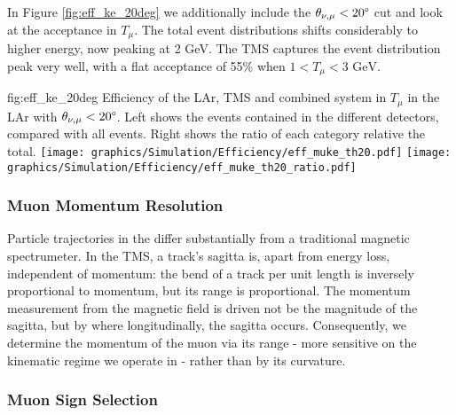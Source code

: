 In Figure \ref{fig:eff_ke_20deg} we additionally include the $\theta_{\nu,\mu}<20\degree$ cut and look at the acceptance in $T_\mu$. The total event distributions shifts considerably to higher energy, now peaking at 2 GeV. The TMS captures the event distribution peak very well, with a flat acceptance of 55\% when $1 < T_\mu < 3 \text{ GeV}$.
\begin{dunefigure}[]{fig:eff_ke_20deg}
{Efficiency of the LAr, TMS and combined system in $T_\mu$ in the LAr with $\theta_{\nu,\mu}<20\degree$. Left shows the events contained in the different detectors, compared with all events. Right shows the ratio of each category relative the total.}
\texttt{[image: graphics/Simulation/Efficiency/eff\_muke\_th20.pdf]} \texttt{[image: graphics/Simulation/Efficiency/eff\_muke\_th20\_ratio.pdf]}
\end{dunefigure}

\subsubsection{Muon Momentum Resolution}

Particle trajectories in the  differ substantially from a traditional magnetic spectrumeter. In the TMS, a track's sagitta is, apart from energy loss, independent of momentum: the bend of a track per unit length is inversely proportional to momentum, but its range is proportional. The momentum measurement from the magnetic field is driven not be the magnitude of the sagitta, but by where longitudinally, the sagitta occurs. Consequently, we determine the momentum of the muon via its range - more sensitive on the kinematic regime we operate in - rather than by its curvature.

\subsubsection{Muon Sign Selection}



